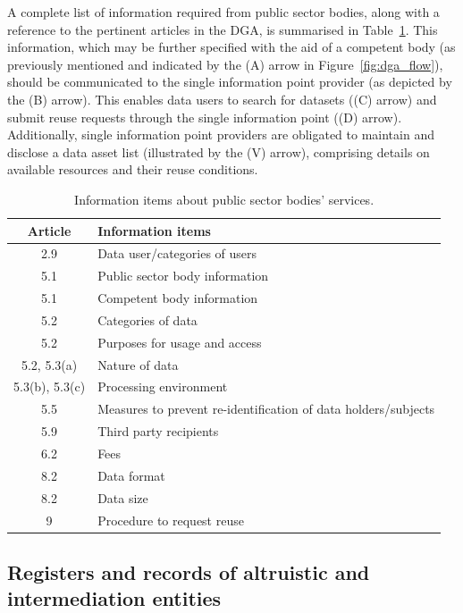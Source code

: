 A complete list of information required from public sector bodies, along with a reference to the pertinent articles in the DGA, is summarised in Table~\ref{tab:conditions_public_data}.
This information, which may be further specified with the aid of a competent body (as previously mentioned and indicated by the (A) arrow in Figure~\ref{fig:dga_flow}), should be communicated to the single information point provider (as depicted by the (B) arrow).
This enables data users to search for datasets ((C) arrow) and submit reuse requests through the single information point ((D) arrow). 
Additionally, single information point providers are obligated to maintain and disclose a data asset list (illustrated by the (V) arrow), comprising details on available resources and their reuse conditions.

\begin{table}[ht]
\centering
\caption{Information items about public sector bodies' services.}
\label{tab:conditions_public_data}
\begin{tabular}{c||l}
\textbf{Article} & \multicolumn{1}{l}{\textbf{Information items}}\\ \hline\hline
2.9 & Data user/categories of users \\ \hline
5.1 & Public sector body information \\ \hline
5.1 & Competent body information \\ \hline
5.2 & Categories of data \\ \hline
5.2 & Purposes for usage and access \\ \hline
5.2, 5.3(a) & Nature of data \\ \hline
5.3(b), 5.3(c) & Processing environment \\ \hline
5.5 & Measures to prevent re-identification of data holders/subjects \\ \hline
5.9 & Third party recipients \\ \hline
6.2 & Fees \\ \hline
8.2 & Data format \\ \hline
8.2 & Data size \\ \hline
9 & Procedure to request reuse
\end{tabular}
\end{table}

\subsection{Registers and records of altruistic and intermediation entities}
\label{sec:registers}

